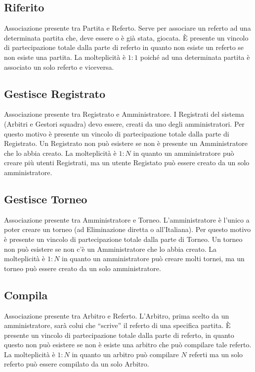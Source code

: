 	\subsection{Riferito}
	Associazione presente tra Partita e Referto.
	Serve per associare un referto ad una determinata partita che, deve essere o è già stata, giocata.
	È presente un vincolo di partecipazione totale dalla parte di referto in quanto non esiste un referto se non esiste una partita. 
	La molteplicità è $1:1$ poiché ad una determinata partita è associato un solo referto e viceversa.
	
	\subsection{Gestisce Registrato}
	Associazione presente tra Registrato e Amministratore.
	I Registrati del sistema (Arbitri e Gestori squadra) devo essere, creati da uno degli amministratori. Per questo motivo è presente un vincolo di partecipazione totale dalla parte di Registrato. Un Registrato non può esistere se non è presente un Amministratore che lo abbia creato.
	La molteplicità è $1:N$ in quanto un amministratore può creare più utenti Registrati, ma un utente Registato può essere creato da un solo amministratore.
	
	\subsection{Gestisce Torneo}
	Associazione presente tra Amministratore e Torneo.
	L’amministratore è l’unico a poter creare un torneo (ad Eliminazione diretta o all’Italiana). Per questo motivo è presente un vincolo di partecipazione totale dalla parte di Torneo. Un torneo non può esistere se non c’è un Amministratore che lo abbia creato.
	La molteplicità è $1:N$ in quanto un amministratore può creare molti tornei, ma un torneo può essere creato da un solo amministratore.
	
	\subsection{Compila}
	Associazione presente tra Arbitro e Referto.
	L'Arbitro, prima scelto da un amministratore, sarà colui che ``scrive'' il referto di una specifica partita.
	È presente un vincolo di partecipazione totale dalla parte di referto, in quanto questo non può esistere se non è esiste una arbitro che può compilare tale referto.
	La molteplicità è $1:N$ in quanto un arbitro può compilare $N$ referti ma un solo referto può essere compilato da un solo Arbitro.
	
